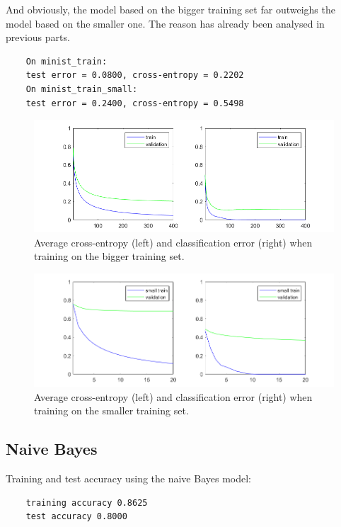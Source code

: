 \documentclass{article}
\begin{document}
And obviously, the model based on the bigger training set far outweighs the model based on the smaller one. The reason has already been analysed in previous parts.

\begin{commandline}
	\begin{verbatim}
	On minist_train:
	test error = 0.0800, cross-entropy = 0.2202
	On minist_train_small:
	test error = 0.2400, cross-entropy = 0.5498
	\end{verbatim}
\end{commandline}

\begin{figure}[H]
	\centering
	\includegraphics[scale=0.7]{figure13}
	\caption{Average cross-entropy (left) and classification error (right) when training on the bigger training set.}
	\label{fig13}
\end{figure}

\begin{figure}[H]
	\centering
	\includegraphics[scale=0.7]{figure14}
	\caption{Average cross-entropy (left) and classification error (right) when training on the smaller training set.}
	\label{fig14}
\end{figure}

\subsection{Naive Bayes}

Training and test accuracy using the naive Bayes model:
\begin{commandline}
	\begin{verbatim}
	training accuracy 0.8625
	test accuracy 0.8000
	\end{verbatim}
\end{commandline}
\end{document}
